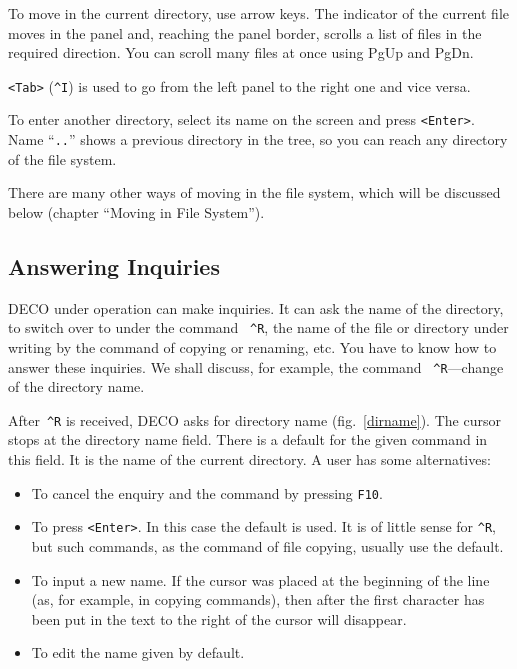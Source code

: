 To move in the current directory, use arrow keys. The 
indicator of the current file moves in the panel and, 
reaching the panel border, scrolls a list of files
in the required direction. You can scroll many
files at once using PgUp and PgDn.

{\tt <Tab>} ({\tt \^{}I}) is used to go from the left panel
to the right one and vice versa.

To enter another directory, select its name on the 
screen and press {\tt <Enter>}. Name ``{\tt ..}'' shows a previous
directory in the tree, so you can reach any directory  of 
the file system. 

There are many other ways of moving in the file 
system, which will be discussed below (chapter ``Moving in File System'').

\subsection{Answering Inquiries}

DECO under operation can make inquiries. It can ask 
the name of the directory, to switch over to under the 
command ~{\tt \^{}R}, the name of the file or directory under
writing by the command of copying or renaming, etc. 
You have to know how to answer these inquiries. We shall
discuss, for example, the command ~{\tt \^{}R}---change of the directory name.


After~{\tt \^{}R} is received, DECO asks for directory name
(fig.~\ref{dirname}). The cursor stops at the directory name field.
There is a default for the given command in this field. It is the
name of the current directory. A user has some alternatives:
\begin{itemize}
\item
To cancel the enquiry and the command by pressing {\tt F10}.
\item
To press {\tt <Enter>}. In this case the default is used. It
is of little sense for {\tt \^{}R}, but such commands, as
the command of file copying, usually use the default.
\item
To input a new name. If the cursor was placed at the beginning of the line
(as, for example, in copying commands), then after the first
character has been put in the text to the right of the cursor will disappear.
\item
To edit the name given by default.
\end{itemize}

